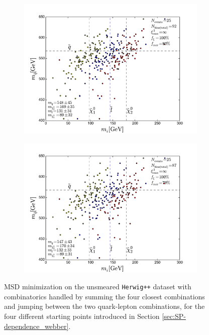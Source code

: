 \documentclass[twoside,english]{uiofysmaster}
\begin{document}
\begin{figure}[hbpt!]
	\begin{subfigure}[b]{0.45\textwidth}
		\includegraphics[width=\textwidth]{figures/improving_combinatorics/herwigpp-4combosum-fit-jump_comb-nosmear-nocut-800-500-300-50.pdf} 
		\caption{ }
	\end{subfigure}
	\begin{subfigure}[b]{0.45\textwidth}
		\includegraphics[width=\textwidth]{figures/improving_combinatorics/herwigpp-4combosum-fit-jump_comb-nosmear-nocut-1000-100-80-30.pdf}
		\caption{ } 
	\end{subfigure}
	\caption{MSD minimization on the unsmeared {\tt Herwig++} dataset with combinatorics handled by summing the four closest combinations and jumping between the two quark-lepton combinations, for the four different starting points introduced in Section \ref{sec:SP-dependence_webber}.}
	\label{fig:4combosum_starting_point_sensitivity_combinatorics-jumping}
\end{figure}
\end{document}
